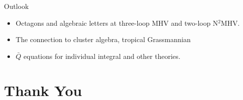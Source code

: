 \documentclass[10pt]{beamer}
\begin{document}

\begin{frame}{Outlook}

\begin{itemize}
  \item Octagons and algebraic letters at three-loop MHV and two-loop N$^{2}$MHV.
  \item The connection to cluster algebra, tropical Grassmannian
  \item $\bar{Q}$ equations for individual integral and other theories.
\end{itemize}


\end{frame}

\section*{Thank You}


\appendix
\iffalse
\only<2> { \item For $k=1$, it's non-trivial, since   
\begin{align*}
\bar{Q} [1,2,3,4,5]\log\frac{\langle1234\rangle}{\langle2345\rangle} &= [1,2,3,4,5]\bar{Q} \log\frac{\langle1234\rangle}{\langle2345\rangle} \\
  &= (\bar{3})_{a} [1,2,3,4,5]\frac{\langle 1234\rangle\chi^{A}_{5}+\text{cyclic}}{\langle2345\rangle\langle 2341\rangle}
\end{align*}}
one example:
\begin{align*}
  Y_{1}^{(2)} \propto \bar{Q}\log u\bar{Q}\log v\bar{Q}\log w
\end{align*}
then it is easy to see that 
\[
\bar{Q}\bigl(Y_{1}^{2}F(u,v,w)\bigr) =0 
\]
for any function $F$ of $u,v,w$.
\fi
\end{document}
